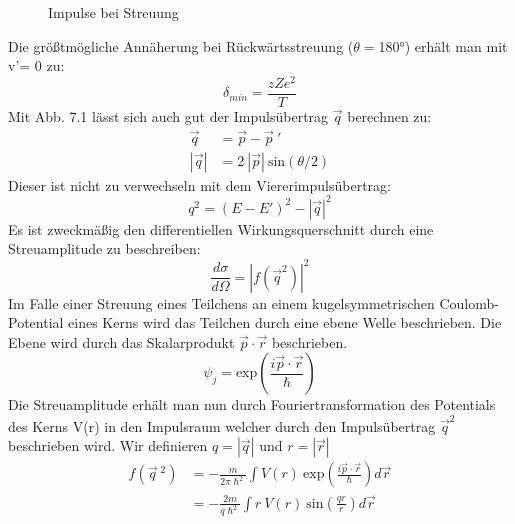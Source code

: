 \documentclass[Ex4_Zusammenfassung.tex]{subfiles}
\begin{document}
\begin{figure}[h]
\centering
	\caption{Impulse bei Streuung}
\end{figure}
Die größtmögliche Annäherung bei Rückwärtsstreuung ($\theta=$180°) erhält man mit v'= 0 zu: 
\begin{equation}
\delta_{min} = \frac{zZe^2}{T}
\end{equation}
Mit Abb. 7.1 lässt sich auch gut der Impulsübertrag $\vec q$ berechnen zu: 
\begin{align}
\vec q &= \vec p - \vec p \ ' \\
|\vec q| &= 2 \  |\vec p| \  \text{sin}(\theta/2)
\end{align} 
Dieser ist nicht zu verwechseln mit dem Viererimpulsübertrag: 
\begin{equation}
q^2 = (E-E')^2 - |\vec q|^2
\end{equation}
Es ist zweckmäßig den differentiellen Wirkungsquerschnitt durch eine Streuamplitude zu beschreiben:
\begin{equation}
\frac{d\sigma}{d\Omega} = |f(\vec q^2)|^2
\end{equation}
Im Falle einer Streuung eines Teilchens an einem kugelsymmetrischen Coulomb-Potential eines Kerns wird das Teilchen durch eine ebene Welle beschrieben. Die Ebene wird durch das Skalarprodukt $ \vec p \cdot \vec r $ beschrieben.
\begin{equation}
\psi_j = \text{exp} \left(\frac{i \vec p \cdot \vec r}{\hslash}\right)
\end{equation}
Die Streuamplitude erhält man nun durch Fouriertransformation des Potentials des Kerns V(r) in den Impulsraum welcher durch den Impulsübertrag $ \vec q^2 $ beschrieben wird. Wir definieren $ q = |\vec q|$ und $ r = |\vec r|$
\begin{align}
f(\vec q \ ^2) &= -\frac{m}{2\pi \hslash^2} \int V(r) \  \text{exp} \left(\frac{i \vec p \cdot \vec r}{\hslash}\right) d \vec r \\
&= -\frac{2m}{q\hslash^2} \int r \  V(r) \  \text{sin} \left(\frac{qr}{r}\right) d\vec r
\end{align} 
\end{document}
